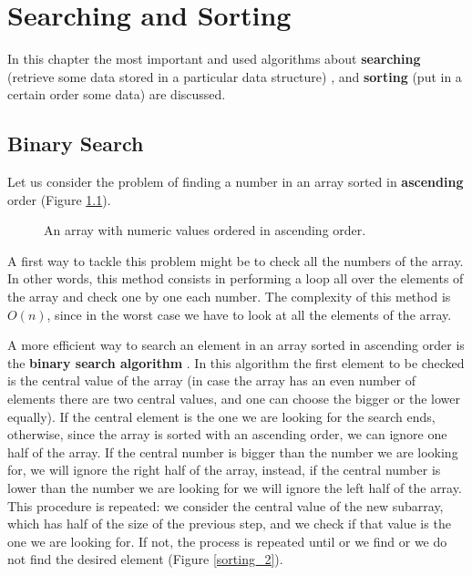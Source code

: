 \chapter{Searching and Sorting}
\label{chp: searchandsorting}
In this chapter the most important and used algorithms about \textbf{searching} (retrieve some data stored in a particular data structure) \cite{wikisearch}, and \textbf{sorting} (put in a certain order some data) \cite{wikisorting} are discussed.
\section{Binary Search}
Let us consider the problem of finding a number in an array sorted in \textbf{ascending} order (Figure \ref{sorting_1}).

\begin{figure}[H]
\centering
{}
\caption[An array with numeric values ordered in ascending order.]{An array with numeric values ordered in ascending order.}
\label{sorting_1}
\end{figure}

A first way to tackle this problem might be to check all the numbers of the array. In other words, this method consists in performing a loop all over the elements of the array and check one by one each number. The complexity of this method is \(O(n)\), since in the worst case we have to look at all the elements of the array.

A more efficient way to search an element in an array sorted in ascending order is the \textbf{binary search algorithm} \cite{wikibinarysearch}. In this algorithm the first element to be checked is the central value of the array (in case the array has an even number of elements there are two central values, and one can choose the bigger or the lower equally). If the central element is the one we are looking for the search ends, otherwise, since the array is sorted with an ascending order, we can ignore one half of the array. If the central number is bigger than the number we are looking for, we will ignore the right half of the array, instead, if the central number is lower than the number we are looking for we will ignore the left half of the array. This procedure is repeated: we consider the central value of the new subarray, which has half of the size of the previous step, and we check if that value is the one we are looking for. If not, the process is repeated until or we find or we do not find the desired element (Figure \ref{sorting_2}).

